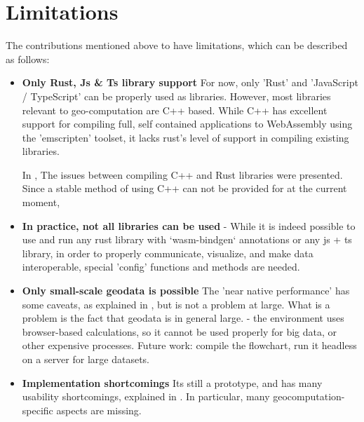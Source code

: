 \begin{itemize}[-]
    
\end{itemize}

\section{Limitations}
\label{sec:limitations}

The contributions mentioned above to have limitations, which can be described as follows:

\begin{itemize}[-]
  \item \textbf{Only Rust, Js \& Ts library support}
For now, only 'Rust' and 'JavaScript / TypeScript' can be properly used as libraries. However, most libraries relevant to geo-computation are C++ based. While C++ has excellent support for compiling full, self contained applications to WebAssembly using the 'emscripten' toolset, it lacks rust's level of support in compiling existing libraries.

    In , The issues between compiling C++ and Rust libraries were presented. 
    Since a stable method of using C++ can not be provided for at the current moment,
  \item \textbf{In practice, not all libraries can be used }
  - While it is indeed possible to use and run any rust library with `wasm-bindgen` annotations or any js + ts library, in order to properly communicate, visualize, and make data interoperable, special 'config' functions and methods are needed. 
  \item \textbf{Only small-scale geodata is possible}
    The 'near native performance' has some caveats, as explained in , but is not a problem at large. 
    What is a problem is the fact that geodata is in general large.  
    - the environment uses browser-based calculations, so it cannot be used properly for big data, or other expensive processes.
    Future work: compile the flowchart, run it headless on a server for large datasets.
  
  \item \textbf{Implementation shortcomings} 
    Its still a prototype, and has many usability shortcomings, explained in .
    In particular, many geocomputation-specific aspects are missing. 
\end{itemize}

